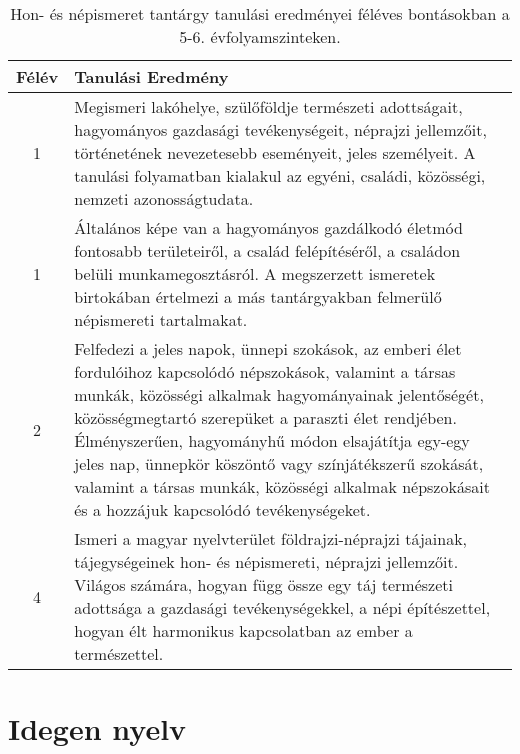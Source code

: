        
           \begin{longtable}{c | p{} }
            \caption[Hon- és népismeret 5-6.]{Hon- és népismeret tantárgy tanulási eredményei féléves bontásokban a 5-6. évfolyamszinteken. }  \\

            \textbf{Félév} & \textbf{Tanulási Eredmény} \\
            \hline
            \endhead
                                
                                          1 &  Megismeri lakóhelye, szülőföldje természeti adottságait, hagyományos gazdasági tevékenységeit, néprajzi jellemzőit, történetének nevezetesebb eseményeit, jeles személyeit. A tanulási folyamatban kialakul az egyéni, családi, közösségi, nemzeti azonosságtudata. \\ \hline
                                          1 &  Általános képe van a hagyományos gazdálkodó életmód fontosabb területeiről, a család felépítéséről, a családon belüli munkamegosztásról. A megszerzett ismeretek birtokában értelmezi a más tantárgyakban felmerülő népismereti tartalmakat. \\ \hline
                                      
                                
                                          2 &  Felfedezi a jeles napok, ünnepi szokások, az emberi élet fordulóihoz kapcsolódó népszokások, valamint a társas munkák, közösségi alkalmak hagyományainak jelentőségét, közösségmegtartó szerepüket a paraszti élet rendjében. Élményszerűen, hagyományhű módon elsajátítja egy-egy jeles nap, ünnepkör köszöntő vagy színjátékszerű szokását, valamint a társas munkák, közösségi alkalmak népszokásait és a hozzájuk kapcsolódó tevékenységeket. \\ \hline
                                      
                                
                                          4 &  Ismeri a magyar nyelvterület földrajzi-néprajzi tájainak, tájegységeinek hon- és népismereti, néprajzi jellemzőit. Világos számára, hogyan függ össze egy táj természeti adottsága a gazdasági tevékenységekkel, a népi építészettel, hogyan élt harmonikus kapcsolatban az ember a természettel. \\ \hline
                                      
                        \end{longtable}
            \clearpage

        \section{Idegen nyelv}

